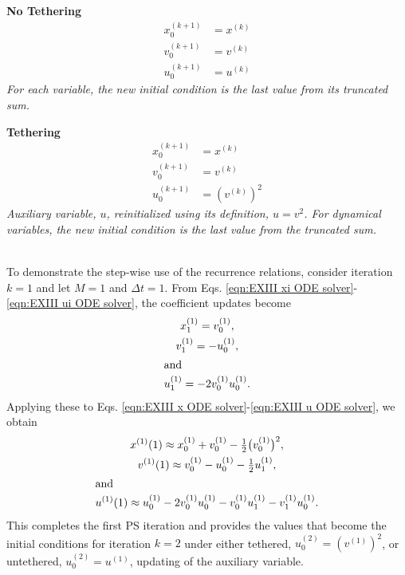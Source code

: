 \documentclass[draft]{agujournal2019}
\begin{document}
\noindent
\begin{minipage}{0.48\textwidth}
\textbf{No Tethering}
    \begin{align*}
        x_0^{(k+1)} &= x^{(k)}\\
        v_0^{(k+1)} &= v^{(k)}\\
        u_0^{(k+1)} &= u^{(k)}
    \end{align*}
\emph{For each variable, the new initial condition is the last value from its truncated sum.\\}
\end{minipage}\hfill
\begin{minipage}{0.48\textwidth}
\textbf{Tethering}
    \begin{align*}
        x_0^{(k+1)} &= x^{(k)}\\
        v_0^{(k+1)} &= v^{(k)}\\
        u_0^{(k+1)} &= \left(v^{(k)}\right)^2
    \end{align*}
\emph{Auxiliary variable, $u$, reinitialized using its definition, $u=v^2$. For dynamical variables, the new initial condition is the last value from the truncated sum.}
\end{minipage}\\

To demonstrate the step-wise use of the recurrence relations, consider iteration $k=1$ and let $M=1$ and $\Delta t=1$.  From Eqs. \eqref{eqn:EXIII xi ODE solver}-\eqref{eqn:EXIII ui ODE solver}, the coefficient updates become
    \begin{gather*}
        x_{1}^{(1)}=v_0^{(1)}, \\
        v_{1}^{(1)}=-u_0^{(1)},  \\
\intertext{and}
        u_{1}^{(1)}=-2v_0^{(1)}u_{0}^{(1)}.
    \end{gather*}
Applying these to Eqs. \eqref{eqn:EXIII x ODE solver}-\eqref{eqn:EXIII u ODE solver}, we obtain
    \begin{gather*}
        x^{(1)}(1) \approx x_0^{(1)} + v_0^{(1)}
        - \tfrac12\big(v_0^{(1)}\big)^{2},\\
        v^{(1)}(1) \approx v_0^{(1)} - u_0^{(1)} - \tfrac12 u_1^{(1)},\\
\intertext{and}
        u^{(1)}(1) \approx  u_0^{(1)} - 2v_0^{(1)}u_0^{(1)} - v_0^{(1)}u_1^{(1)} - v_1^{(1)}u_0^{(1)}.
    \end{gather*}
This completes the first PS iteration and provides the values that become the initial conditions for iteration $k=2$ under either tethered, $u_0^{(2)}=(v^{(1)})^2$, or untethered, $u_0^{(2)}=u^{(1)}$, updating of the auxiliary variable.
\end{document}
